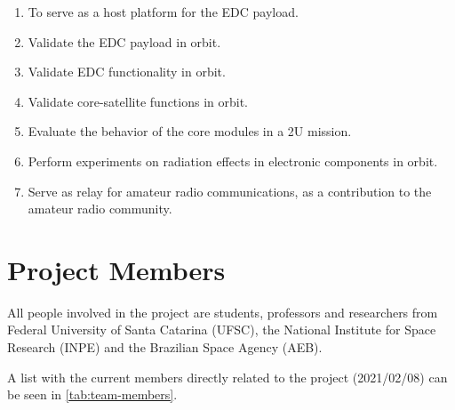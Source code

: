 \begin{enumerate}
    \item To serve as a host platform for the EDC payload.
    \item Validate the EDC payload in orbit.
    \item Validate EDC functionality in orbit.
    \item Validate core-satellite functions in orbit.
    \item Evaluate the behavior of the core modules in a 2U mission.
    \item Perform experiments on radiation effects in electronic components in orbit.
    \item Serve as relay for amateur radio communications, as a contribution to the amateur radio community.
\end{enumerate}

\section{Project Members}

All people involved in the project are students, professors and researchers from Federal University of Santa Catarina (UFSC), the National Institute for Space Research (INPE) and the Brazilian Space Agency (AEB).

A list with the current members directly related to the project (2021/02/08) can be seen in \autoref{tab:team-members}.

